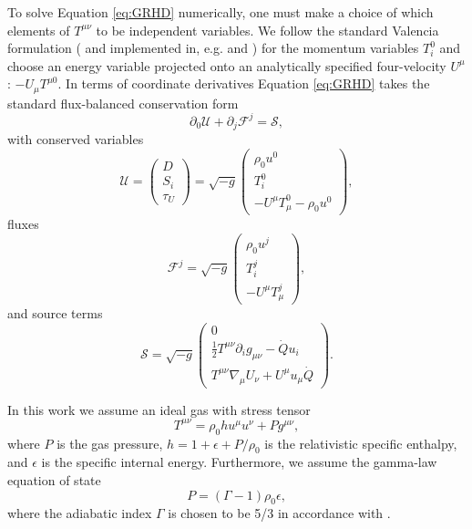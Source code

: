 \documentclass{emulateapj}
\newcommand{\Gam}{\Gamma}
\newcommand{\eps}{\epsilon}
\newcommand{\pd}{\partial}
\begin{document}
To solve Equation \eqref{eq:GRHD} numerically, one must make a choice of which elements of $T^{\mu\nu}$ to be independent variables.  We follow the standard Valencia formulation (\citealt{Marti91, Banyuls97,Font08} and implemented in, e.g. \citealt{HARM} and \citealt{Duez05}) for the momentum variables $T^0_i$ and choose an energy variable projected onto an analytically specified four-velocity $U^\mu$: $-U_\mu T^{\mu 0}$.
In terms of coordinate derivatives Equation \eqref{eq:GRHD} takes the standard flux-balanced conservation form
\begin{equation}
    \pd_0 \mathcal{U} + \pd_j \mathcal{F}^j = \mathcal{S} , \label{eq:consLaw}
\end{equation}
with conserved variables
\begin{equation}
    \mathcal{U} = \begin{pmatrix} D \\
                            S_i \\
                            \tau_U
                \end{pmatrix} = \sqrt{-g} \begin{pmatrix} \rho_0 u^0 \\ 
                                                    T^0_i \\
                                                    -U^\mu T_\mu^0 - \rho_0 u^0 \end{pmatrix} , \label{eq:cons}
\end{equation}
fluxes
\begin{equation}
    \mathcal{F}^j = \sqrt{-g} \begin{pmatrix} \rho_0 u^j \\
                                                T^j_i \\
                                                -U^\mu T_\mu^j \end{pmatrix} ,\label{eq:fluxes}
\end{equation}
and source terms 
\begin{equation}
    \mathcal{S} = \sqrt{-g} \begin{pmatrix} 0 \\
                        \frac{1}{2}T^{\mu\nu}\pd_i g_{\mu\nu} - \dot{Q}u_i \\
                        T^{\mu\nu}\nabla_\mu U_\nu + U^\mu u_\mu \dot{Q} \end{pmatrix} .\label{eq:sources}
\end{equation}

In this work we assume an ideal gas with stress tensor
\begin{equation}
	T^{\mu\nu} = \rho_0 h u^\mu u^\nu + P g^{\mu\nu} ,
\end{equation}
where $P$ is the gas pressure, $h = 1 + \eps + P/\rho_0$ is the relativistic specific enthalpy, and $\eps$ is the specific internal energy. Furthermore, we assume the gamma-law equation of state
\begin{equation}
	P = (\Gam - 1) \rho_0 \eps , \label{eq:gammalaw}
\end{equation}
where the adiabatic index $\Gamma$ is chosen to be 5/3 in accordance with \cite{Farris14}.
\end{document}
